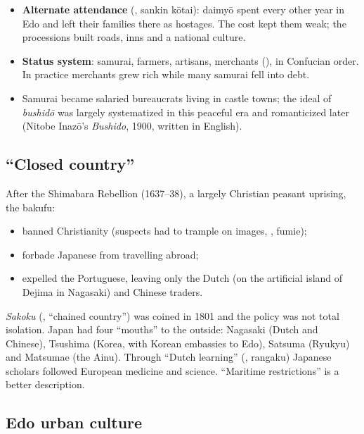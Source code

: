 \begin{itemize}
  \item \textbf{Alternate attendance} (, sankin kōtai): daimyō spent every
        other year in Edo and left their families there as hostages. The cost kept them
        weak; the processions built roads, inns and a national culture.
  \item \textbf{Status system}: samurai, farmers, artisans, merchants (), in
        Confucian order. In practice merchants grew rich while many samurai fell into debt.
  \item Samurai became salaried bureaucrats living in castle towns; the ideal of
        \emph{bushidō} was largely systematized in this peaceful era and romanticized
        later (Nitobe Inazō's \emph{Bushido}, 1900, written in English).
\end{itemize}

\subsection{``Closed country''}

After the Shimabara Rebellion (1637--38), a largely Christian peasant uprising, the bakufu:

\begin{itemize}
  \item banned Christianity (suspects had to trample on images, , fumie);
  \item forbade Japanese from travelling abroad;
  \item expelled the Portuguese, leaving only the Dutch (on the artificial island of Dejima
        in Nagasaki) and Chinese traders.
\end{itemize}

\begin{important}
\emph{Sakoku} (, ``chained country'') was coined in 1801 and the policy was not
total isolation. Japan had four ``mouths'' to the outside: Nagasaki (Dutch and Chinese),
Tsushima (Korea, with Korean embassies to Edo), Satsuma (Ryukyu) and Matsumae (the Ainu).
Through ``Dutch learning'' (, rangaku) Japanese scholars followed European
medicine and science. ``Maritime restrictions'' is a better description.
\end{important}

\subsection{Edo urban culture}

